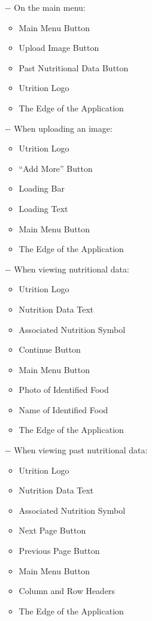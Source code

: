 \documentclass[12pt, titlepage]{article}
\begin{document}
\begin{enumerate}
\begin{enumerate}
	\item[$-$] On the main menu:
	\begin{itemize}
		\item Main Menu Button
		\item Upload Image Button
		\item Past Nutritional Data Button
		\item Utrition Logo
		\item The Edge of the Application
	\end{itemize}
	\item[$-$] When uploading an image:
	\begin{itemize}
		\item Utrition Logo
		\item “Add More” Button
		\item Loading Bar
		\item Loading Text
		\item Main Menu Button
		\item The Edge of the Application	
	\end{itemize}
	\item[$-$] When viewing nutritional data:
	\begin{itemize}
		\item Utrition Logo
		\item Nutrition Data Text
		\item Associated Nutrition Symbol
		\item Continue Button
		\item Main Menu Button
		\item Photo of Identified Food
		\item Name of Identified Food
		\item The Edge of the Application	
	\end{itemize}
	\item[$-$] When viewing past nutritional data:
	\begin{itemize}
		\item Utrition Logo
		\item Nutrition Data Text
		\item Associated Nutrition Symbol
		\item Next Page Button
		\item Previous Page Button
		\item Main Menu Button
		\item Column and Row Headers
		\item The Edge of the Application

\end{itemize}
\end{enumerate}
\end{enumerate}
\end{document}
